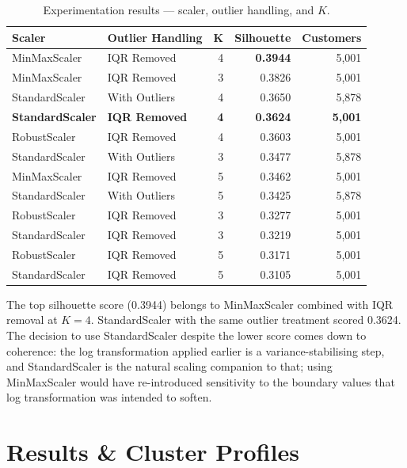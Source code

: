 \documentclass[12pt, a4paper]{article}
\begin{document}
\begin{table}[H]
\centering
\caption{Experimentation results — scaler, outlier handling, and $K$.}
\label{tab:experiments}
\begin{tabular}{@{}llrrr@{}}
\toprule
\textbf{Scaler} & \textbf{Outlier Handling} & \textbf{K} & \textbf{Silhouette} & \textbf{Customers} \\
\midrule
MinMaxScaler    & IQR Removed   & 4 & \textbf{0.3944} & 5,001 \\
MinMaxScaler    & IQR Removed   & 3 & 0.3826          & 5,001 \\
StandardScaler  & With Outliers & 4 & 0.3650          & 5,878 \\
\textbf{StandardScaler} & \textbf{IQR Removed} & \textbf{4} & \textbf{0.3624} & \textbf{5,001} \\
RobustScaler    & IQR Removed   & 4 & 0.3603          & 5,001 \\
StandardScaler  & With Outliers & 3 & 0.3477          & 5,878 \\
MinMaxScaler    & IQR Removed   & 5 & 0.3462          & 5,001 \\
StandardScaler  & With Outliers & 5 & 0.3425          & 5,878 \\
RobustScaler    & IQR Removed   & 3 & 0.3277          & 5,001 \\
StandardScaler  & IQR Removed   & 3 & 0.3219          & 5,001 \\
RobustScaler    & IQR Removed   & 5 & 0.3171          & 5,001 \\
StandardScaler  & IQR Removed   & 5 & 0.3105          & 5,001 \\
\bottomrule
\end{tabular}
\end{table}

\noindent The top silhouette score (0.3944) belongs to MinMaxScaler combined with IQR removal at $K=4$. StandardScaler with the same outlier treatment scored 0.3624. The decision to use StandardScaler despite the lower score comes down to coherence: the log transformation applied earlier is a variance-stabilising step, and StandardScaler is the natural scaling companion to that; using MinMaxScaler would have re-introduced sensitivity to the boundary values that log transformation was intended to soften.

\section{Results \& Cluster Profiles}\label{sec:results}
\end{document}
